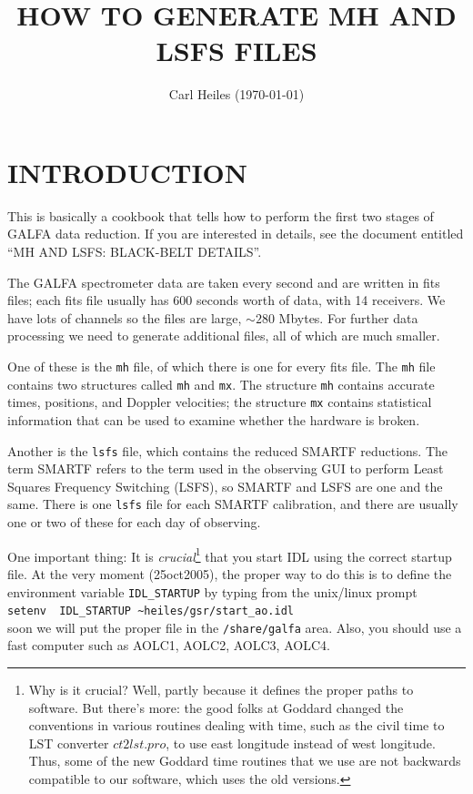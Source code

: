 \documentclass[psfig,preprint]{aastex}
\begin{document}
                                                                                
\title{HOW TO GENERATE MH AND LSFS FILES}

\author{Carl Heiles (\today)}

\tableofcontents


\section{INTRODUCTION} \label{introduction}

	This is basically a cookbook that tells how to perform the first two
stages of GALFA data reduction. If you are interested in details, see
the document entitled ``MH AND LSFS: BLACK-BELT DETAILS''.

	The GALFA spectrometer data are taken every second and are
written in fits files; each fits file usually has 600 seconds worth of
data, with 14 receivers.  We have lots of channels so the files are
large, $\sim 280$ Mbytes.  For further data processing we need to
generate additional files, all of which are much smaller. 

	One of these is the \verb$mh$ file, of which there is one for
every fits file.  The \verb$mh$ file contains two structures called
\verb$mh$ and \verb$mx$.  The structure \verb$mh$ contains accurate
times, positions, and Doppler velocities; the structure \verb$mx$
contains statistical information that can be used to examine whether
the hardware is broken. 

	Another is the \verb$lsfs$ file, which contains the reduced
SMARTF reductions.  The term SMARTF refers to the term used in the
observing GUI to perform Least Squares Frequency Switching (LSFS), so
SMARTF and LSFS are one and the same.  There is one \verb$lsfs$ file for
each SMARTF calibration, and there are usually one or two of these for
each day of observing. 

	One important thing: It is {\it crucial}\footnote{Why is it
crucial? Well, partly because it defines the proper paths to software.
But there's more: the good folks at Goddard changed the conventions in
various routines dealing with time, such as the civil time to LST
converter $ct2lst.pro$, to use east longitude instead of west
longitude. Thus, some of the new Goddard time routines that we use are
not backwards compatible to our software, which uses the old versions.} 
that you start IDL using the
correct startup file. At the very moment (25oct2005), the proper way to do this is
to define the environment variable \verb$IDL_STARTUP$ by typing from the
unix/linux prompt \\
\verb$setenv  IDL_STARTUP ~heiles/gsr/start_ao.idl$ \\
soon we will put the proper file in the \verb$/share/galfa$ area.
Also, you should use a fast
computer such as AOLC1, AOLC2, AOLC3, AOLC4.
\end{document}
